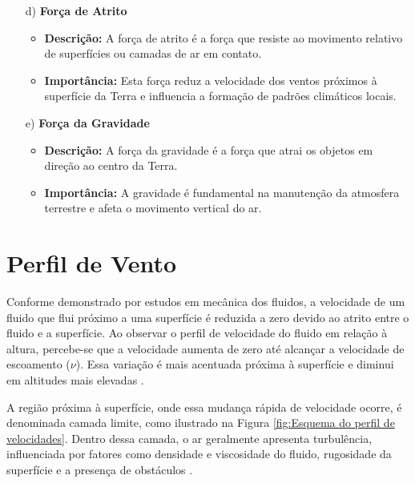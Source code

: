 \begin{itemize}
    \item[d)] \textbf{Força de Atrito}
    \begin{itemize}
        \item \textbf{Descrição:} A força de atrito é a força que resiste ao movimento relativo de superfícies ou camadas de ar em contato.       
        \item \textbf{Importância:} Esta força reduz a velocidade dos ventos próximos à superfície da Terra e influencia a formação de padrões climáticos locais.
    \end{itemize}
    
    \item[e)] \textbf{Força da Gravidade}
    \begin{itemize}
        \item \textbf{Descrição:} A força da gravidade é a força que atrai os objetos em direção ao centro da Terra.         
        \item \textbf{Importância:} A gravidade é fundamental na manutenção da atmosfera terrestre e afeta o movimento vertical do ar.
    \end{itemize}
\end{itemize}


    \section{Perfil de Vento}
    
        \par Conforme demonstrado por estudos em mecânica dos fluidos, a velocidade de um fluido que flui próximo a uma superfície é reduzida a zero devido ao atrito entre o fluido e a superfície. Ao observar o perfil de velocidade do fluido em relação à altura, percebe-se que a velocidade aumenta de zero até alcançar a velocidade de escoamento ($\nu$). Essa variação é mais acentuada próxima à superfície e diminui em altitudes mais elevadas \cite{batchelor2000}. 

        \par A região próxima à superfície, onde essa mudança rápida de velocidade ocorre, é denominada camada limite, como ilustrado na Figura \ref{fig:Esquema do perfil de velocidades}. Dentro dessa camada, o ar geralmente apresenta turbulência, influenciada por fatores como densidade e viscosidade do fluido, rugosidade da superfície e a presença de obstáculos \cite{schlichting2000}.

